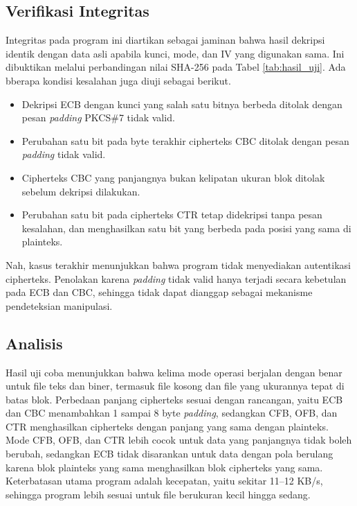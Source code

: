 \subsection{Verifikasi Integritas}
Integritas pada program ini diartikan sebagai jaminan bahwa hasil dekripsi identik dengan data asli apabila kunci, mode, dan IV yang digunakan sama. Ini dibuktikan melalui perbandingan nilai SHA-256 pada Tabel \ref{tab:hasil_uji}. Ada bberapa kondisi kesalahan juga diuji sebagai berikut.
\begin{itemize}[noitemsep]
    \item Dekripsi ECB dengan kunci yang salah satu bitnya berbeda ditolak dengan pesan \textit{padding} PKCS\#7 tidak valid.
    \item Perubahan satu bit pada byte terakhir cipherteks CBC ditolak dengan pesan \textit{padding} tidak valid.
    \item Cipherteks CBC yang panjangnya bukan kelipatan ukuran blok ditolak sebelum dekripsi dilakukan.
    \item Perubahan satu bit pada cipherteks CTR tetap didekripsi tanpa pesan kesalahan, dan menghasilkan satu bit yang berbeda pada posisi yang sama di plainteks.
\end{itemize}

Nah, kasus terakhir menunjukkan bahwa program tidak menyediakan autentikasi cipherteks. Penolakan karena \textit{padding} tidak valid hanya terjadi secara kebetulan pada ECB dan CBC, sehingga tidak dapat dianggap sebagai mekanisme pendeteksian manipulasi. 

\subsection{Analisis}
Hasil uji coba menunjukkan bahwa kelima mode operasi berjalan dengan benar untuk file teks dan biner, termasuk file kosong dan file yang ukurannya tepat di batas blok. Perbedaan panjang cipherteks sesuai dengan rancangan, yaitu ECB dan CBC menambahkan 1 sampai 8 byte \textit{padding}, sedangkan CFB, OFB, dan CTR menghasilkan cipherteks dengan panjang yang sama dengan plainteks. Mode CFB, OFB, dan CTR lebih cocok untuk data yang panjangnya tidak boleh berubah, sedangkan ECB tidak disarankan untuk data dengan pola berulang karena blok plainteks yang sama menghasilkan blok cipherteks yang sama. Keterbatasan utama program adalah kecepatan, yaitu sekitar 11--12 KB/s, sehingga program lebih sesuai untuk file berukuran kecil hingga sedang.

\pagebreak
